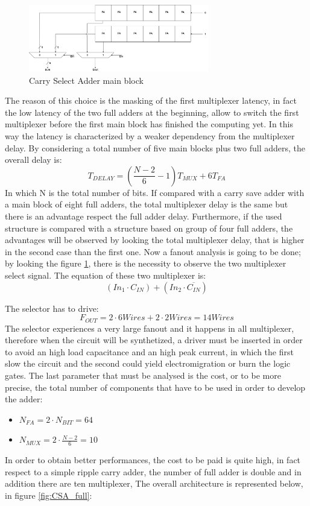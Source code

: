 \begin{figure}[H]
	\centering
	\includegraphics[width=0.7\textwidth]{sec2/images/C_sel_A.png}
	\caption{Carry Select Adder main block}
	\label{fig:carry_sel}
\end{figure}
\noindent
The reason of this choice is the masking of the first multiplexer latency, in fact the low latency of the two full adders at the beginning, allow to switch the first multiplexer before the first main block has finished the computing yet. In this way the latency is characterized by a weaker dependency from the multiplexer delay. By considering a total number of five main blocks plus two full adders, the overall delay is:
\begin{equation}
T_{DELAY} = (\frac{N-2}{6} - 1)T_{MUX} + 6T_{FA}
\end{equation}
In which N is the total number of bits.
If compared with a carry save adder with a main block of eight full adders, the total multiplexer delay is the same but there is an advantage respect the full adder delay. Furthermore, if the used structure is compared with a structure based on group of four full adders, the advantages will be observed by looking the total multiplexer delay, that is higher in the second case than the first one.
Now a fanout analysis is going to be done; by looking the figure \ref{fig:carry_sel}, there is the necessity to observe the two multiplexer select signal. The equation of these two multiplexer is:
\begin{equation}
 (In_1 \cdot C_{IN}) + (In_2 \cdot \overline{C_{IN}})
\end{equation}

The selector has to drive:
\begin{equation}
F_{OUT} = 2\cdot 6Wires + 2 \cdot 2Wires = 14Wires
\end{equation}
The selector experiences a very large fanout and it happens in all multiplexer, therefore when the circuit will be synthetized, a driver must be inserted in order to avoid an high load capacitance and an high peak current, in which the first slow the circuit and the second could yield electromigration or burn the logic gates.
\noindent
The last parameter that must be analysed is the cost, or to be more precise, the total number of components that have to be used in order to develop the adder:
\begin{itemize}
\item $N_{FA} = 2\cdot N_{BIT} = 64$
\item $N_{MUX} = 2\cdot \frac{N-2}{6}  = 10$
\end{itemize}
In order to obtain better performances, the cost to be paid is quite high, in fact respect to a simple ripple carry adder, the number of full adder is double and in addition there are ten multiplexer, The overall architecture is represented below, in figure \ref{fig:CSA_full}:

